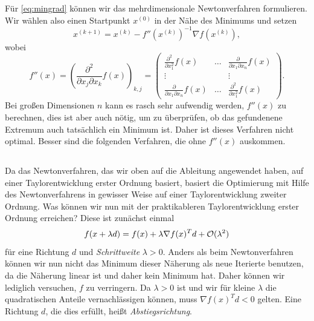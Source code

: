 Für \eqref{eq:mingrad} können wir das mehrdimensionale Newtonverfahren
formulieren. Wir wählen also einen Startpunkt $x^{(0)}$ in der Nähe
des Minimums und setzen
\begin{equation}
  x^{(k+1)} = x^{(k)} - f''\left(x^{(k)}\right)^{-1}\nabla f\left(x^{(k)}\right),
\end{equation}
wobei
\begin{equation}
  f''(x) = 
  \left(\frac{\partial^2}{\partial x_j\partial x_k}f(x)\right)_{k,j} = 
  \begin{pmatrix}
    \frac{\partial^2}{\partial x_1^2}f(x) & \ldots &
    \frac{\partial}{\partial x_1\partial x_n}f(x)\\
    \vdots               &        & \vdots \\
    \frac{\partial}{\partial x_1\partial x_n}f(x) & \ldots &
    \frac{\partial^2}{\partial x_1^2}f(x)
  \end{pmatrix}.
\end{equation}
Bei großen Dimensionen $n$ kann es rasch sehr aufwendig werden,
$f''(x)$ zu berechnen, dies ist aber auch nötig, um zu überprüfen,
ob das gefundenene Extremum auch tatsächlich ein Minimum ist. Daher
ist dieses Verfahren nicht optimal. Besser sind die folgenden
Verfahren, die ohne $f''(x)$ auskommen.

\subsection{}

Da das Newtonverfahren, das wir oben auf die Ableitung angewendet
haben, auf einer Taylorentwicklung erster Ordnung
basiert, basiert die Optimierung mit Hilfe des Newtonverfahrens in
gewisser Weise auf einer Taylorentwicklung zweiter Ordnung. Was können
wir nun mit der praktikableren Taylorentwicklung erster Ordnung
erreichen? Diese ist zunächst einmal
\begin{equation}
  \label{eq:steepestdescentexpand}
  f(x + \lambda d) = f(x) + \lambda \nabla f(x)^Td + \mathcal O(\lambda^2)
\end{equation}
für eine Richtung $d$ und \emph{Schrittweite} $\lambda > 0$.  Anders
als beim Newtonverfahren können wir nun nicht das Minimum dieser
Näherung als neue Iterierte benutzen, da die Näherung linear ist und
daher kein Minimum hat. Daher können wir lediglich versuchen, $f$ zu
verringern. Da $\lambda>0$ ist und wir für kleine $\lambda$ die
quadratischen Anteile vernachlässigen können, muss $\nabla f(x)^Td < 0$
gelten. Eine Richtung $d$, die dies erfüllt, heißt
\emph{Abstiegsrichtung}.

